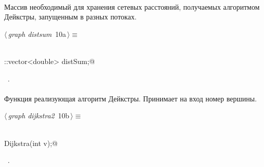 \documentclass[12pt]{article}
\begin{document}
\paragraph{}
Массив необходимый для хранения сетевых расстояний, получаемых алгоритмом Дейкстры, запущенным в разных потоках. 
\begin{flushleft} \small
\begin{minipage}{\linewidth}\label{scrap16}\raggedright\small
{} $\langle\,${\itshape graph distsum}\nobreak\ {\footnotesize {10a}}$\,\rangle\equiv$
\vspace{-1ex}
\begin{list}{}{} \item
\mbox{}\verb@@\\
\mbox{}\verb@std::vector<double> distSum;@\\
\mbox{}\verb@@{\NWsep}
\end{list}
\vspace{-1.5ex}
\footnotesize
\begin{list}{}{\setlength{\itemsep}{-\parsep}\setlength{\itemindent}{-\leftmargin}}
\item \NWtxtMacroRefIn\ .

\item{}
\end{list}
\end{minipage}\vspace{4ex}
\end{flushleft}
\paragraph{}
Функция реализующая алгоритм Дейкстры. Принимает на вход номер вершины.
\begin{flushleft} \small
\begin{minipage}{\linewidth}\label{scrap17}\raggedright\small
{} $\langle\,${\itshape graph dijkstra2}\nobreak\ {\footnotesize {10b}}$\,\rangle\equiv$
\vspace{-1ex}
\begin{list}{}{} \item
\mbox{}\verb@@\\
\mbox{}\verb@double Dijkstra(int v);@\\
\mbox{}\verb@@{\NWsep}
\end{list}
\vspace{-1.5ex}
\footnotesize
\begin{list}{}{\setlength{\itemsep}{-\parsep}\setlength{\itemindent}{-\leftmargin}}
\item \NWtxtMacroRefIn\ .

\item{}
\end{list}
\end{minipage}\vspace{4ex}
\end{flushleft}
\end{document}
